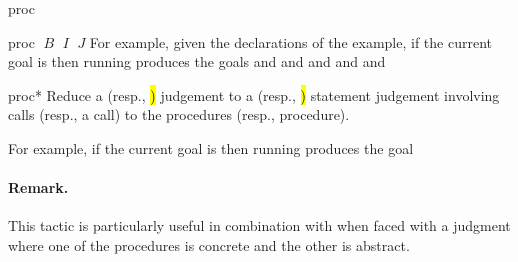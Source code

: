 \begin{tactic}{proc}
\begin{tsyntax}{proc $\;B$ $\;I$ $\;J$}
  \medskip
  For example, given the declarations of the  example,
  if the current goal is
   then
  running 
  produces the goals
  and
  and
  and
  and
  and
  \end{tsyntax}

  \begin{tsyntax}{proc*}
    Reduce a \prhl (resp., \hl) judgement to a \prhl (resp., \hl)
    statement judgement involving calls (resp., a call) to the
    procedures (resp., procedure).

  \bigskip
  For example, if the current goal is
   then
  running 
  produces the goal

  \paragraph{Remark.}
  This tactic is particularly useful in combination with
   when faced with a \prhl judgment where one of the
  procedures is concrete and the other is abstract.
  \end{tsyntax}
\end{tactic}
